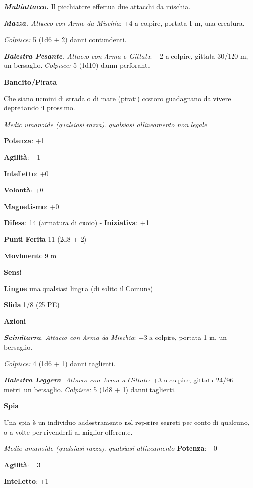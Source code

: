 \begin{multicols}{2}
\emph{\textbf{Multiattacco.}} Il picchiatore effettua due attacchi da
mischia.

\emph{\textbf{Mazza.} Attacco con Arma da Mischia}: +4 a colpire,
portata 1 m, una creatura.

\emph{Colpisce:} 5 (1d6 + 2) danni contundenti.

\emph{\textbf{Balestra Pesante.} Attacco con Arma a Gittata}: +2 a
colpire, gittata 30/120 m, un bersaglio. \emph{Colpisce:} 5 (1d10) danni
perforanti.

\textbf{Bandito/Pirata}

Che siano uomini di strada o di mare (pirati) costoro guadagnano da
vivere depredando il prossimo.

\emph{Media umanoide (qualsiasi razza), qualsiasi allineamento non
legale}

\textbf{Potenza}: +1

\textbf{Agilità}: +1

\textbf{Intelletto}: +0

\textbf{Volontà}: +0

\textbf{Magnetismo}: +0

\textbf{Difesa}: 14 (armatura di cuoio) - \textbf{Iniziativa}: +1

\textbf{Punti Ferita} 11 (2d8 + 2)

\textbf{Movimento} 9 m

\textbf{Sensi} 

\textbf{Lingue} una qualsiasi lingua (di solito il Comune)

\textbf{Sfida} 1/8 (25 PE)\smallskip

\smallskip\textbf{Azioni}

\emph{\textbf{Scimitarra.} Attacco con Arma da Mischia}: +3 a colpire,
portata 1 m, un bersaglio.

\emph{Colpisce:} 4 (1d6 + 1) danni taglienti.

\emph{\textbf{Balestra Leggera.} Attacco con Arma a Gittata}: +3 a
colpire, gittata 24/96 metri, un bersaglio. \emph{Colpisce:} 5 (1d8 + 1)
danni taglienti.

\textbf{Spia}

Una spia è un individuo addestramento nel reperire segreti per conto di
qualcuno, o a volte per rivenderli al miglior offerente.

\emph{Media umanoide (qualsiasi razza), qualsiasi allineamento}
\textbf{Potenza}: +0

\textbf{Agilità}: +3

\textbf{Intelletto}: +1


\end{multicols}
